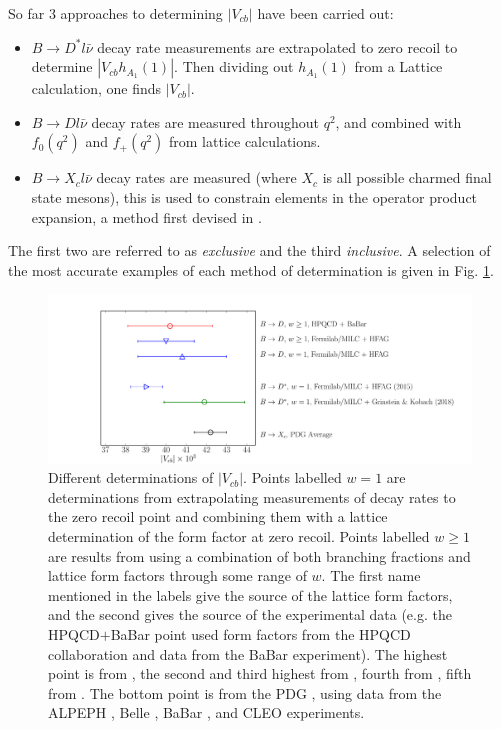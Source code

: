So far 3 approaches to determining $|V_{cb}|$ have been carried out:
\begin{itemize}
\item
  $B\to D^* l\bar{\nu}$ decay rate measurements are extrapolated to zero recoil to determine $|V_{cb}h_{A_1}(1)|$. Then dividing out $h_{A_1}(1)$ from a Lattice calculation, one finds $|V_{cb}|$.
\item
  $B\to D l\bar{\nu}$ decay rates are measured throughout $q^2$, and combined with $f_0(q^2)$ and $f_+(q^2)$ from lattice calculations.
\item
  $B\to X_c l\bar{\nu}$ decay rates are measured (where $X_c$ is all possible charmed final state mesons), this is used to constrain elements in the operator product expansion, a method first devised in \cite{Bigi:1996si,Hoang:1998hm}.
\end{itemize}
The first two are referred to as {\it{exclusive}} and the third {\it{inclusive}}. A selection of the most accurate examples of each method of determination is given in Fig. \ref{fig:Vcb_plot}.
\begin{figure}
  \vspace{-10pt}
  \hspace{-40pt}
    \includegraphics[width=1.2\textwidth]{images/Vcb_plot.pdf}
  \caption{Different determinations of $|V_{cb}|$. Points labelled $w=1$ are determinations from extrapolating measurements of decay rates to the zero recoil point and combining them with a lattice determination of the form factor at zero recoil. Points labelled $w\geq 1$ are results from using a combination of both branching fractions and lattice form factors through some range of $w$. The first name mentioned in the labels give the source of the lattice form factors, and the second gives the source of the experimental data (e.g. the HPQCD$+$BaBar point used form factors from the HPQCD collaboration and data from the BaBar experiment). The highest point is from \cite{Na:2015kha}, the second and third highest from \cite{Lattice:2015rga}, fourth from \cite{Bailey:2014tva}, fifth from \cite{Grinstein:2017nlq}. The bottom point is from the PDG \cite{PhysRevD.98.030001}, using data from the ALPEPH \cite{BUSKULIC1995236}, Belle \cite{Abe:2001yf}, BaBar \cite{Aubert:2008yv,Aubert:2009ac}, and CLEO \cite{Bartelt:1998dq} experiments.
    \label{fig:Vcb_plot}}
\end{figure}

